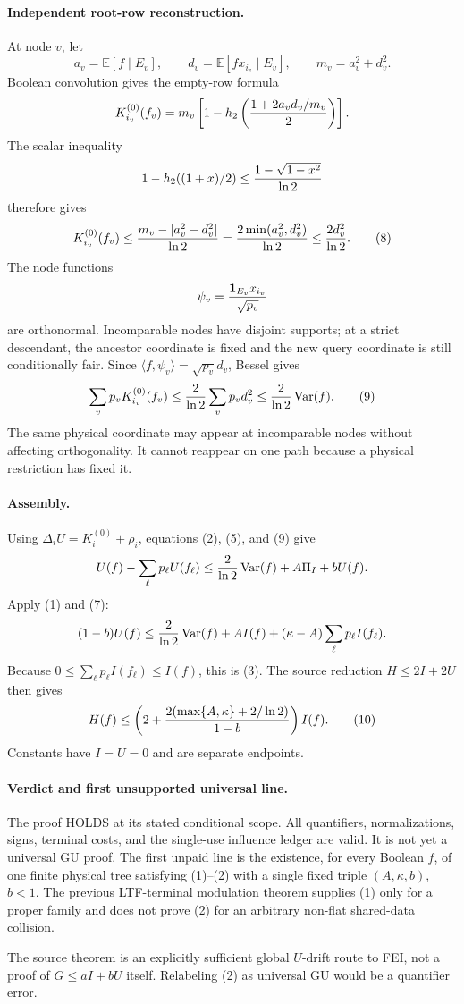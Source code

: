 \paragraph{Independent root-row reconstruction.}
At node $v$, let
\[
 a_v=\mathbb E[f\mid E_v],\qquad
 d_v=\mathbb E[f x_{i_v}\mid E_v],\qquad m_v=a_v^2+d_v^2.
\]
Boolean convolution gives the empty-row formula
\[
 K_{i_v}^{(0)}(f_v)
 =m_v\left[1-h_2\left({1+2a_vd_v/m_v\over2}\right)\right].
\]
The scalar inequality
\[
 1-h_2((1+x)/2)\le{1-\sqrt{1-x^2}\over\ln2}
\]
therefore gives
\[
 K_{i_v}^{(0)}(f_v)
 \le {m_v-|a_v^2-d_v^2|\over\ln2}
 ={2\min(a_v^2,d_v^2)\over\ln2}
 \le {2d_v^2\over\ln2}.                                    \tag{8}
\]
The node functions
\[
 \psi_v={\mathbf1_{E_v}x_{i_v}\over\sqrt{p_v}}
\]
are orthonormal.  Incomparable nodes have disjoint supports; at a strict
descendant, the ancestor coordinate is fixed and the new query coordinate
is still conditionally fair.  Since
$\langle f,\psi_v\rangle=\sqrt{p_v}d_v$, Bessel gives
\[
 \sum_vp_vK_{i_v}^{(0)}(f_v)
 \le {2\over\ln2}\sum_vp_vd_v^2
 \le {2\over\ln2}\operatorname{Var}(f).                    \tag{9}
\]
The same physical coordinate may appear at incomparable nodes without
affecting orthogonality.  It cannot reappear on one path because a physical
restriction has fixed it.

\paragraph{Assembly.}
Using $\Delta_iU=K_i^{(0)}+\rho_i$, equations (2), (5), and (9) give
\[
 U(f)-\sum_\ell p_\ell U(f_\ell)
 \le {2\over\ln2}\operatorname{Var}(f)+A\Pi_I+bU(f).
\]
Apply (1) and (7):
\[
 (1-b)U(f)
 \le {2\over\ln2}\operatorname{Var}(f)+AI(f)
       +(\kappa-A)\sum_\ell p_\ell I(f_\ell).
\]
Because $0\le\sum_\ell p_\ell I(f_\ell)\le I(f)$, this is (3).
The source reduction $H\le2I+2U$ then gives
\[
 H(f)\le
 \left(2+{2(\max\{A,\kappa\}+2/\ln2)\over1-b}\right)I(f).   \tag{10}
\]
Constants have $I=U=0$ and are separate endpoints.

\paragraph{Verdict and first unsupported universal line.}
The proof HOLDS at its stated conditional scope.  All quantifiers,
normalizations, signs, terminal costs, and the single-use influence ledger
are valid.  It is not yet a universal GU proof.  The first unpaid line is
the existence, for every Boolean $f$, of one finite physical tree satisfying
(1)--(2) with a single fixed triple $(A,\kappa,b)$, $b<1$.  The previous
LTF-terminal modulation theorem supplies (1) only for a proper family and
does not prove (2) for an arbitrary non-flat shared-data collision.

The source theorem is an explicitly sufficient global $U$-drift route to
FEI, not a proof of $G\le aI+bU$ itself.  Relabeling (2) as universal GU
would be a quantifier error.
